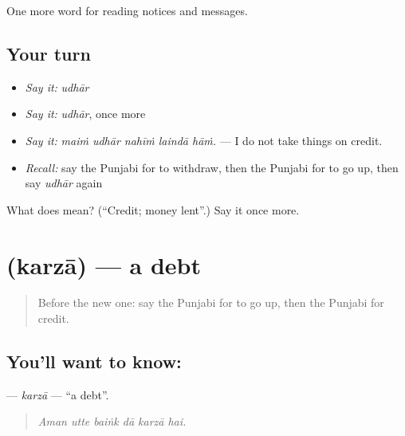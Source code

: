 \begin{grammarlens}[title={What you've built}]
One more word for reading notices and messages.
\end{grammarlens}

\subsection*{Your turn}
\begin{itemize}
\raggedright
  \item \emph{Say it:} \emph{udhār}
  \item \emph{Say it:} \emph{udhār}, once more
  \item \emph{Say it:} \emph{maiṁ udhār nahīṁ laindā hāṁ.} — I do not take things on credit.
  \item \emph{Recall:} say the Punjabi for to withdraw, then the Punjabi for to go up, then say \emph{udhār} again
\end{itemize}

\begin{tcolorbox}[breakable,colback=teal!4,colframe=teal!35!black,title={Before you move on}]
What does  mean? (\textquotedblleft{}Credit; money lent\textquotedblright{}.) Say it once more.
\end{tcolorbox}
\section[\texorpdfstring{\pa{ਕਰਜ਼ਾ} (karzā)}{ਕਰਜ਼ਾ (karzā)}]{ (karzā) — a debt}

\label{lesson:PA-C258-karza}



\begin{quote}
Before the new one: say the Punjabi for to go up, then the Punjabi for credit.
\end{quote}

\subsection*{You'll want to know: }
\textbf{} — \emph{karzā} — \textquotedblleft{}a debt\textquotedblright{}.

\begin{quote}
     
\end{quote}

\begin{quote}
\emph{Aman utte baiṅk dā karzā hai.}
\end{quote}

